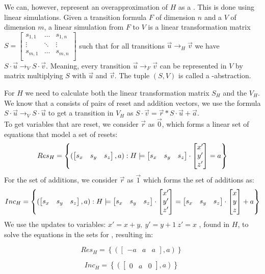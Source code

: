 We can, however, represent an overapproximation of $H$ as a \qvasr. This is done using linear simulations. Given a transition formula $F$ of dimension $n$ and a \qvasr $V$ of dimension $m$, a linear simulation from $F$ to $V$ is a linear transformation matrix \\ 
$S = 
\begin{bmatrix}
	 s_{1 ,1} & \ldots & s_{1, n} \\
	\vdots & \ddots & \vdots \\
	s_{m ,1} & \ldots & s_{m, n} \\
\end{bmatrix}$ 
such that for all transitions $\vec{u} \rightarrow_H \vec{v}$ we have $S\cdot\vec{u} \rightarrow_V S\cdot\vec{v}$. Meaning, every transition $\vec{u} \rightarrow_F \vec{v}$ can be represented in $V$ by matrix multiplying $S$ with $\vec{u}$ and $\vec{v}$. The tuple $(S, V)$ is called a \qvasr-abstraction. \par For $H$ we need to calculate both the linear transformation matrix $S_H$ and the \qvasr $V_H$. We know that a \qvasr consists of pairs of reset and addition vectors, we use the formula $S \cdot \vec{u} \rightarrow_V S \cdot \vec{u}$ to get a transition in $V_H$ as $S\cdot\vec{v} = \vec{r}*S\cdot\vec{u} + \vec{a}$. \\ To get variables that are reset, we consider $\vec{r}$ as $\vec{0}$, which forms a linear set of equations that model a set of resets:
\begin{equation*}
	Res_H = \left\{ (\begin{bmatrix} s_x & s_y & s_z \end{bmatrix}, a) : H \models \begin{bmatrix} s_x & s_y & s_z \end{bmatrix} \cdot \begin{bmatrix} x' \\ y' \\ z' \end{bmatrix} = a \right\}	
\end{equation*}
For the set of additions, we consider $\vec{r}$ as $\vec{1}$ which forms the set of additions as:
\begin{equation*}
	Inc_H = \left\{(\begin{bmatrix} s_x & s_y & s_z \end{bmatrix}, a) : H \models \begin{bmatrix} s_x & s_y & s_z \end{bmatrix} \cdot \begin{bmatrix} x' \\ y' \\ z' \end{bmatrix} = \begin{bmatrix} s_x & s_y & s_z \end{bmatrix} \cdot \begin{bmatrix} x \\ y \\ z \end{bmatrix} + a\right\}	
\end{equation*}
We use the updates to variables: $x' = x + y, \ y'= y + 1\ z' = x$ , found in $H$, to solve the equations in the sets for \s, resulting in: 
\begin{center}
	\begin{minipage}{0.5\linewidth}
		\begin{equation*}
			Res_H = \left\{ (\begin{bmatrix} -a & a & a \end{bmatrix}, a) \right\}\
		\end{equation*}
	\end{minipage}
	\begin{minipage}{0.4\linewidth}
		\begin{equation*}
			Inc_H = \left\{ (\begin{bmatrix} 0 & a & 0 \end{bmatrix}, a) \right\}\ 
		\end{equation*}
	\end{minipage}
\end{center}
